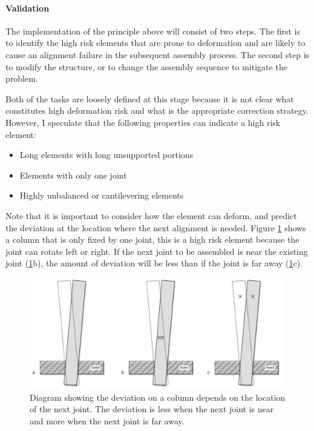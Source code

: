 \paragraph{Validation}
The implementation of the principle above will consist of two steps. The first is to identify the high risk elements that are prone to deformation and are likely to cause an alignment failure in the subsequent assembly process. The second step is to modify the structure, or to change the assembly sequence to mitigate the problem.

Both of the tasks are loosely defined at this stage because it is not clear what constitutes high deformation risk and what is the appropriate correction strategy. However, I speculate that the following properties can indicate a high risk element:
\begin{itemize}
    \item Long elements with long unsupported portions
    \item Elements with only one joint
    \item Highly unbalanced or cantilevering elements
\end{itemize}

Note that it is important to consider how the element can deform, and predict the deviation at the location where the next alignment is needed. Figure \ref{fig:deviation-on-column-depends-on-location} shows a column that is only fixed by one joint, this is a high risk element because the joint can rotate left or right. If the next joint to be assembled is near the existing joint (\ref{fig:deviation-on-column-depends-on-location}b), the amount of deviation will be less than if the joint is far away (\ref{fig:deviation-on-column-depends-on-location}c). 

\begin{figure}[!h]
    \centering
    \includegraphics[width=0.99\textwidth]{images/7a/img01.jpg}
    \caption[Diagram showing the deviation on a column depends on the location of the next joint]
    {Diagram showing the deviation on a column depends on the location of the next joint. The deviation is less when the next joint is near and more when the next joint is far away.}
    \label{fig:deviation-on-column-depends-on-location}
\end{figure}

